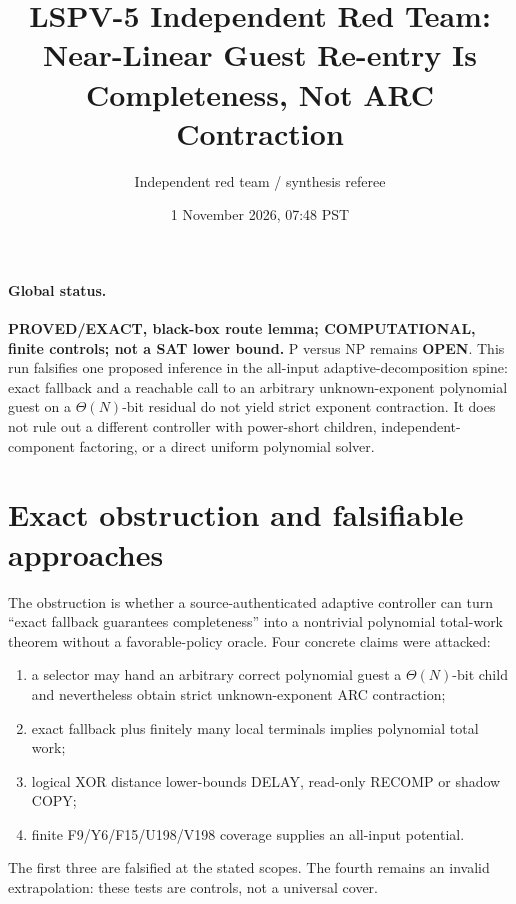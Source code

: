 \documentclass[11pt]{article}
\title{LSPV-5 Independent Red Team:\\Near-Linear Guest Re-entry Is Completeness, Not ARC Contraction}
\author{Independent red team / synthesis referee}
\date{1 November 2026, 07:48 PST}
\newcommand{\OPEN}{\textbf{OPEN}}
\begin{document}
\maketitle

\paragraph{Global status.}
\textbf{PROVED/EXACT, black-box route lemma; COMPUTATIONAL, finite controls; not a SAT lower bound.}
P versus NP remains \OPEN.  This run falsifies one proposed inference in the
all-input adaptive-decomposition spine: exact fallback and a reachable call to
an arbitrary unknown-exponent polynomial guest on a $\Theta(N)$-bit residual do
not yield strict exponent contraction.  It does not rule out a different
controller with power-short children, independent-component factoring, or a
direct uniform polynomial solver.

\section{Exact obstruction and falsifiable approaches}
The obstruction is whether a source-authenticated adaptive controller can turn
``exact fallback guarantees completeness'' into a nontrivial polynomial
total-work theorem without a favorable-policy oracle.  Four concrete claims
were attacked:
\begin{enumerate}
\item a selector may hand an arbitrary correct polynomial guest a
$\Theta(N)$-bit child and nevertheless obtain strict unknown-exponent ARC
contraction;
\item exact fallback plus finitely many local terminals implies polynomial
total work;
\item logical XOR distance lower-bounds DELAY, read-only RECOMP or shadow COPY;
\item finite F9/Y6/F15/U198/V198 coverage supplies an all-input potential.
\end{enumerate}
The first three are falsified at the stated scopes.  The fourth remains an
invalid extrapolation: these tests are controls, not a universal cover.
\end{document}
